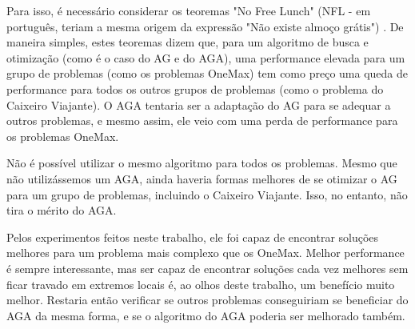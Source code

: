 Para isso, é necessário considerar os teoremas "No Free Lunch" (NFL - em português, teriam a mesma origem da expressão "Não existe almoço grátis") \cite{wolpert1997no}. De maneira simples, estes teoremas dizem que, para um algoritmo de busca e otimização (como é o caso do AG e do AGA), uma performance elevada para um grupo de problemas (como os problemas OneMax) tem como preço uma queda de performance para todos os outros grupos de problemas (como o problema do Caixeiro Viajante). O AGA tentaria ser a adaptação do AG para se adequar a outros problemas, e mesmo assim, ele veio com uma perda de performance para os problemas OneMax.

Não é possível utilizar o mesmo algoritmo para todos os problemas. Mesmo que não utilizássemos um AGA, ainda haveria formas melhores de se otimizar o AG para um grupo de problemas, incluindo o Caixeiro Viajante. Isso, no entanto, não tira o mérito do AGA.

Pelos experimentos feitos neste trabalho, ele foi capaz de encontrar soluções melhores para um problema mais complexo que os OneMax. Melhor performance é sempre interessante, mas ser capaz de encontrar soluções cada vez melhores sem ficar travado em extremos locais é, ao olhos deste trabalho, um benefício muito melhor. Restaria então verificar se outros problemas conseguiriam se beneficiar do AGA da mesma forma, e se o algoritmo do AGA poderia ser melhorado também.
